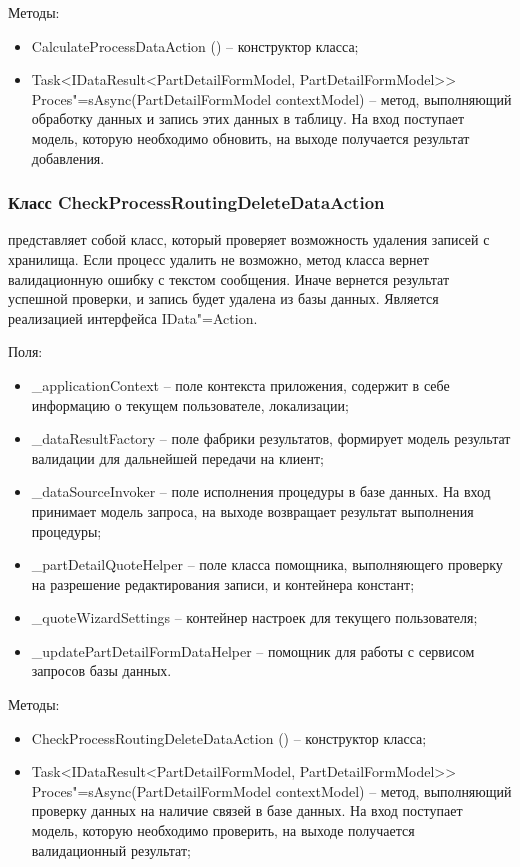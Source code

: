 Методы:
\begin{itemize}
  \item CalculateProcessDataAction () – конструктор класса;
  \item Task<IDataResult<PartDetailFormModel, PartDetailFormModel>> Proces"=sAsync(PartDetailFormModel contextModel) – метод, выполняющий обработку данных и запись этих данных в таблицу. На вход поступает модель, которую необходимо обновить, на выходе получается результат добавления.
\end{itemize}

\subsubsection{Класс CheckProcessRoutingDeleteDataAction }
\label{sub:arch_and_mod:data_layer:check_process_routing_delete}

представляет собой класс, который проверяет возможность удаления записей с хранилища. Если процесс удалить не возможно, метод класса вернет валидационную ошибку с текстом сообщения. Иначе вернется результат успешной проверки, и запись будет удалена из базы данных. Является реализацией интерфейса IData"=Action.

Поля:
\begin{itemize}
  \item \_applicationContext – поле контекста приложения, содержит в себе информацию о текущем пользователе, локализации;
  \item \_dataResultFactory – поле фабрики результатов, формирует модель результат валидации для дальнейшей передачи на клиент;
  \item \_dataSourceInvoker – поле исполнения процедуры в базе данных. На вход принимает модель запроса, на выходе возвращает результат выполнения процедуры;
  \item \_partDetailQuoteHelper – поле класса помощника, выполняющего проверку на разрешение редактирования записи, и контейнера констант;
  \item \_quoteWizardSettings – контейнер настроек для текущего пользователя;
  \item \_updatePartDetailFormDataHelper – помощник для работы с сервисом запросов базы данных.
\end{itemize}

Методы:
\begin{itemize}
  \item CheckProcessRoutingDeleteDataAction () – конструктор класса;
  \item Task<IDataResult<PartDetailFormModel, PartDetailFormModel>> Proces"=sAsync(PartDetailFormModel contextModel) – метод, выполняющий проверку данных на наличие связей в базе данных. На вход поступает модель, которую необходимо проверить, на выходе получается валидационный результат;
\end{itemize}

